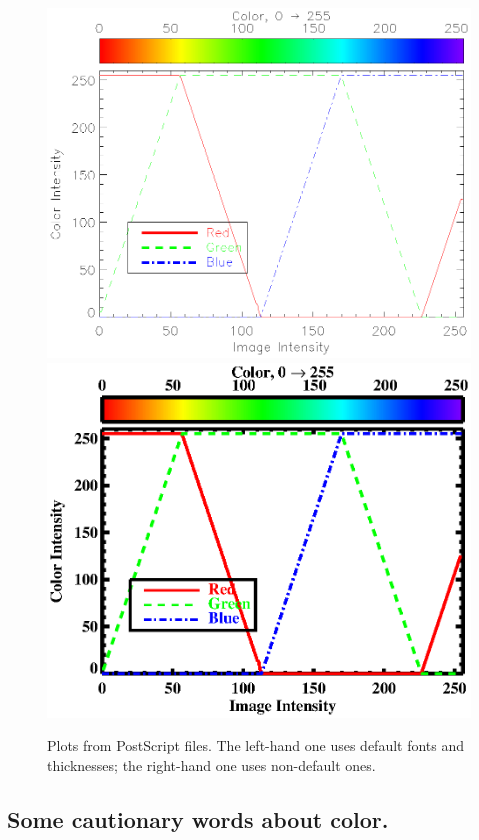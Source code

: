 \documentclass[psfig,preprint]{aastex}
\begin{document}
\begin{figure}[h!]
\begin{center}
\includegraphics[scale=.6]{ps_ch0_rainbowplot.ps}
\includegraphics[scale=.6]{ps_ch1_rainbowplot.ps}
\end{center}
\caption{Plots from PostScript files. The left-hand one uses default
  fonts and thicknesses; the right-hand one uses non-default ones.
  \label{fig}}
\end{figure}

\subsection{Some cautionary words about color.} 
\end{document}
